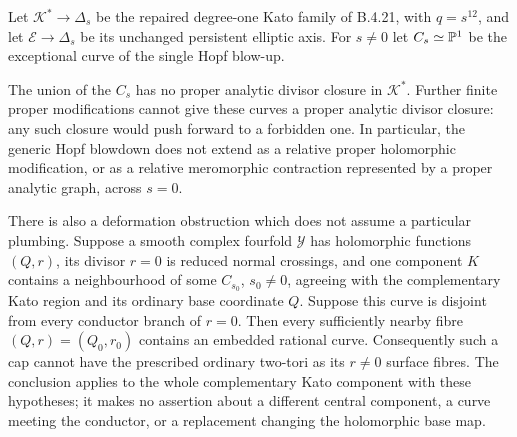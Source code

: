 \begin{proposition}
Let $\mathcal K^*\to\Delta_s$ be the repaired degree-one
Kato family of B.4.21, with $q=s^{12}$, and let
$\mathcal E\to\Delta_s$ be its unchanged persistent elliptic
axis. For $s\ne0$ let $C_s\simeq\mathbb P^1$ be the exceptional
curve of the single Hopf blow-up.

The union of the $C_s$ has no proper analytic divisor
closure in $\mathcal K^*$. Further finite proper modifications
cannot give these curves a proper analytic divisor closure:
any such closure would push forward to a forbidden one.
In particular, the generic Hopf blowdown does not extend
as a relative proper holomorphic modification, or as a
relative meromorphic contraction represented by a proper
analytic graph, across $s=0$.

There is also a deformation obstruction which does not
assume a particular plumbing. Suppose a smooth complex
fourfold $\mathcal Y$ has holomorphic functions $(Q,r)$,
its divisor $r=0$ is reduced normal crossings, and one
component $K$ contains a neighbourhood of some $C_{s_0}$,
$s_0\ne0$, agreeing with the complementary Kato region
and its ordinary base coordinate $Q$. Suppose this curve
is disjoint from every conductor branch of $r=0$.
Then every sufficiently nearby fibre $(Q,r)=(Q_0,r_0)$
contains an embedded rational curve. Consequently such a
cap cannot have the prescribed ordinary two-tori as its
$r\ne0$ surface fibres. The conclusion applies to the
whole complementary Kato component with these hypotheses;
it makes no assertion about a different central component,
a curve meeting the conductor, or a replacement changing
the holomorphic base map.
\end{proposition}
